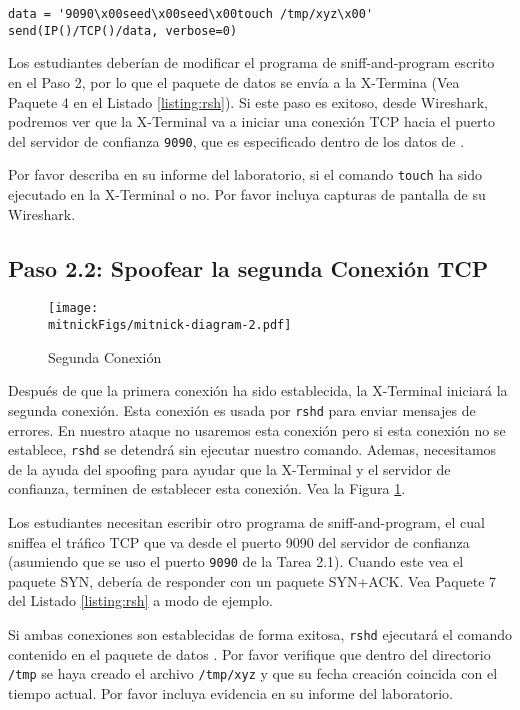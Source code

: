 \begin{lstlisting}
data = '9090\x00seed\x00seed\x00touch /tmp/xyz\x00'
send(IP()/TCP()/data, verbose=0)
\end{lstlisting}
 
Los estudiantes deberían de modificar el programa de sniff-and-program escrito en el Paso 2, por lo que el paquete de datos \rsh se envía a la X-Termina (Vea Paquete 4 en el Listado \ref{listing:rsh}). 
Si este paso es exitoso, desde Wireshark, podremos ver que la X-Terminal va a iniciar una conexión TCP hacia el puerto del servidor de confianza \texttt{9090}, que es especificado dentro de los datos de \rsh.

Por favor describa en su informe del laboratorio, si el comando \texttt{touch} ha sido ejecutado en la X-Terminal o no. Por favor incluya capturas de pantalla de su Wireshark.


\subsection{Paso 2.2: Spoofear la segunda Conexión TCP}
\label{sec:second-conn}

\begin{figure}[htb]
\centering
\texttt{[image: \\mitnickFigs/mitnick-diagram-2.pdf]}
\caption{Segunda Conexión}
\label{fig:second-conn}
\end{figure}

Después de que la primera conexión ha sido establecida, la X-Terminal iniciará la segunda conexión. Esta conexión es usada por \texttt{rshd} para enviar mensajes de errores. En nuestro ataque no usaremos esta conexión pero si esta conexión no se establece, \texttt{rshd} se detendrá sin ejecutar nuestro comando. Ademas, necesitamos de la ayuda del spoofing para ayudar que la X-Terminal y el servidor de confianza, terminen de establecer esta conexión.
Vea la Figura \ref{fig:second-conn}. 

Los estudiantes necesitan escribir otro programa de sniff-and-program, el cual sniffea el tráfico TCP que va desde el puerto 9090 del servidor de confianza (asumiendo que se uso el puerto \texttt{9090} de la Tarea 2.1). Cuando este vea el paquete SYN, debería de responder con un paquete SYN+ACK. Vea Paquete 7 del Listado \ref{listing:rsh} a modo de ejemplo.

Si ambas conexiones son establecidas de forma exitosa, \texttt{rshd} ejecutará el comando contenido en el paquete de datos \rsh. Por favor verifique que dentro del directorio \texttt{/tmp} se haya creado el archivo \texttt{/tmp/xyz} y que su fecha creación coincida con el tiempo actual. Por favor incluya evidencia en su informe del laboratorio.



